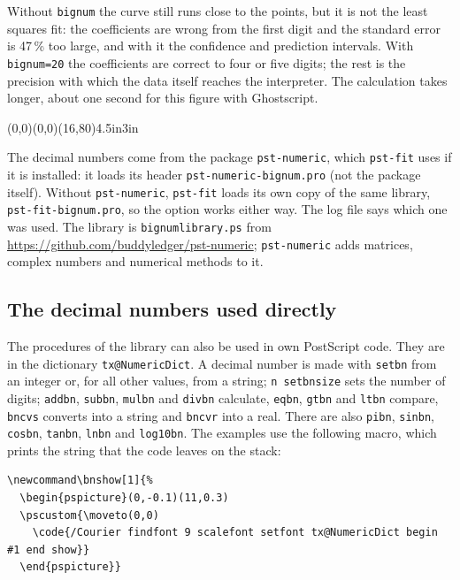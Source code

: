 \documentclass[11pt,english,BCOR10mm,DIV12,bibliography=totoc,parskip=false,
   smallheadings, headexclude,footexclude,oneside]{pst-doc}
\makeatletter
\newcommand\bnshow[1]{%
  \begin{pspicture}(0,-0.1)(11,0.3)
  \pscustom{\moveto(0,0)
    \code{/Courier findfont 9 scalefont setfont tx@NumericDict begin #1 end show}}
  \end{pspicture}}
\makeatother
\begin{document}
\medskip
Without \texttt{bignum} the curve still runs close to the points, but it is
not the least squares fit: the coefficients are wrong from the first digit
and the standard error is 47\,\% too large, and with it the confidence and
prediction intervals. With \texttt{bignum=20} the coefficients are correct to
four or five digits; the rest is the precision with which the data itself
reaches the interpreter. The calculation takes longer, about one second for
this figure with Ghostscript.

\begin{LTXexample}[pos=t]
\begin{psgraph}[arrows=->,Dy=20,Dx=2](0,0)(0,0)(16,80){4.5in}{3in}
\listplot[decimals=6,EqPos=1 75,printconfig=0 1 0 0 0 0 0 1]{\HighOrder}
\listplot[plotstyle=dots]{\HighOrder}
\end{psgraph}
\end{LTXexample}

The decimal numbers come from the package \texttt{pst-numeric}, which
\texttt{pst-fit} uses if it is installed: it loads its header
\texttt{pst-numeric-bignum.pro} (not the package itself). Without
\texttt{pst-numeric}, \texttt{pst-fit} loads its own copy of the same
library, \texttt{pst-fit-bignum.pro}, so the option works either way. The
log file says which one was used. The library is \texttt{bignumlibrary.ps}
from \url{https://github.com/buddyledger/pst-numeric}; \texttt{pst-numeric}
adds matrices, complex numbers and numerical methods to it.

\subsection{The decimal numbers used directly}
The procedures of the library can also be used in own PostScript code. They
are in the dictionary \texttt{tx@NumericDict}. A decimal number is made with
\texttt{setbn} from an integer or, for all other values, from a string;
\texttt{n setbnsize} sets the number of digits; \texttt{addbn}, \texttt{subbn},
\texttt{mulbn} and \texttt{divbn} calculate, \texttt{eqbn}, \texttt{gtbn} and
\texttt{ltbn} compare, \texttt{bncvs} converts into a string and
\texttt{bncvr} into a real. There are also \texttt{pibn}, \texttt{sinbn},
\texttt{cosbn}, \texttt{tanbn}, \texttt{lnbn} and \texttt{log10bn}. The
examples use the following macro, which prints the string that the code
leaves on the stack:

\begin{lstlisting}
\newcommand\bnshow[1]{%
  \begin{pspicture}(0,-0.1)(11,0.3)
  \pscustom{\moveto(0,0)
    \code{/Courier findfont 9 scalefont setfont tx@NumericDict begin #1 end show}}
  \end{pspicture}}
\end{lstlisting}
\end{document}
